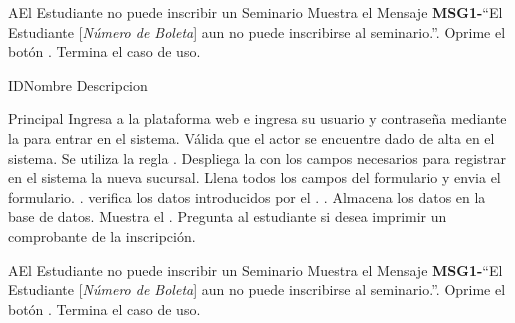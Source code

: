 		\begin{UCtrayectoriaA}{A}{El Estudiante no puede inscribir un Seminario}
			\UCpaso Muestra el Mensaje {\bf MSG1-}``El Estudiante [{\em Número de Boleta}] aun no puede inscribirse al seminario.''.
			\UCpaso[\UCactor] Oprime el botón .
			\UCpaso[] Termina el caso de uso.
		\end{UCtrayectoriaA}



\begin{UseCase}{ID}{Nombre}{
		Descripcion
	}
	\end{UseCase}

	\begin{UCtrayectoria}{Principal}
		\UCpaso[\UCactor] Ingresa a la plataforma web e ingresa su usuario y contraseña mediante la \label{CU17Login} para entrar en el sistema.
		\UCpaso Válida que el actor se encuentre dado de alta en el sistema. Se utiliza la regla  .
		\UCpaso Despliega la  con los campos necesarios para registrar en el sistema la nueva sucursal.
		\UCpaso[\UCactor] Llena todos los campos del formulario y envia el formulario. \label{CU17SeleccionarSeminario}.
		\UCpaso verifica los datos introducidos por el \UCactor.  .
		\UCpaso Almacena los datos en la base de datos.
		\UCpaso Muestra el . 
		\UCpaso Pregunta al estudiante si desea imprimir un comprobante de la inscripción.		
	\end{UCtrayectoria}
		
		\begin{UCtrayectoriaA}{A}{El Estudiante no puede inscribir un Seminario}
			\UCpaso Muestra el Mensaje {\bf MSG1-}``El Estudiante [{\em Número de Boleta}] aun no puede inscribirse al seminario.''.
			\UCpaso[\UCactor] Oprime el botón .
			\UCpaso[] Termina el caso de uso.
		\end{UCtrayectoriaA}
